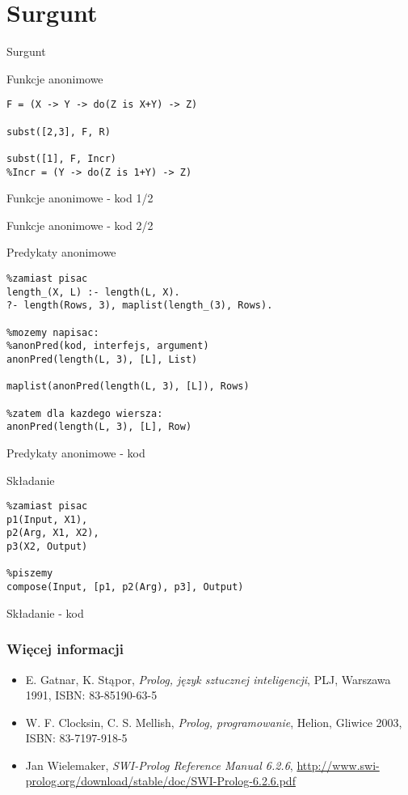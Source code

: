 \documentclass[blue]{beamer}
\newcommand{\tytul}[1]{\begin{frame}\begin{center}\begin{Huge}#1\end{Huge}\end{center}\end{frame}}
\begin{document}
\section{Surgunt}
\tytul{Surgunt}
\begin{frame}[fragile]{Funkcje anonimowe}
\begin{lstlisting}
F = (X -> Y -> do(Z is X+Y) -> Z)

subst([2,3], F, R)

subst([1], F, Incr)
%Incr = (Y -> do(Z is 1+Y) -> Z)
\end{lstlisting}
\end{frame}
\begin{frame}{Funkcje anonimowe - kod 1/2}

\end{frame}
\begin{frame}{Funkcje anonimowe - kod 2/2}

\end{frame}
\begin{frame}[fragile]{Predykaty anonimowe}
\begin{lstlisting}
%zamiast pisac
length_(X, L) :- length(L, X).
?- length(Rows, 3), maplist(length_(3), Rows).

%mozemy napisac:
%anonPred(kod, interfejs, argument)
anonPred(length(L, 3), [L], List)

maplist(anonPred(length(L, 3), [L]), Rows)

%zatem dla kazdego wiersza:
anonPred(length(L, 3), [L], Row)
\end{lstlisting}
\end{frame}
\begin{frame}{Predykaty anonimowe - kod}

\end{frame}
\begin{frame}[fragile]{Składanie}
\begin{lstlisting}
%zamiast pisac
p1(Input, X1),
p2(Arg, X1, X2),
p3(X2, Output)

%piszemy
compose(Input, [p1, p2(Arg), p3], Output)
\end{lstlisting}
\end{frame}
\begin{frame}{Składanie - kod}

\end{frame}
\begin{frame}
\frametitle{Więcej informacji}
\begin{itemize}
\item E. Gatnar, K. Stąpor, \textit{Prolog, język sztucznej inteligencji}, PLJ, Warszawa 1991, ISBN: 83-85190-63-5
\item W. F. Clocksin, C. S. Mellish, \textit{Prolog, programowanie}, Helion, Gliwice 2003, ISBN: 83-7197-918-5
\item Jan Wielemaker, \textit{SWI-Prolog Reference Manual 6.2.6}, \url{http://www.swi-prolog.org/download/stable/doc/SWI-Prolog-6.2.6.pdf}
\end{itemize}
\end{frame}
\end{document}

